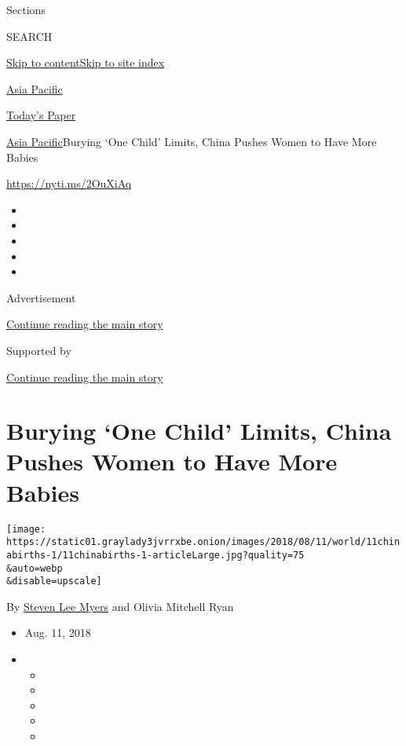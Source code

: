 Sections

SEARCH

\protect\hyperlink{site-content}{Skip to
content}\protect\hyperlink{site-index}{Skip to site index}

\href{https://www.nytimes3xbfgragh.onion/section/world/asia}{Asia
Pacific}

\href{https://myaccount.nytimes3xbfgragh.onion/auth/login?response_type=cookie\&client_id=vi}{}

\href{https://www.nytimes3xbfgragh.onion/section/todayspaper}{Today's
Paper}

\href{/section/world/asia}{Asia Pacific}\textbar{}Burying `One Child'
Limits, China Pushes Women to Have More Babies

\url{https://nyti.ms/2OuXiAq}

\begin{itemize}
\item
\item
\item
\item
\item
\end{itemize}

Advertisement

\protect\hyperlink{after-top}{Continue reading the main story}

Supported by

\protect\hyperlink{after-sponsor}{Continue reading the main story}

\hypertarget{burying-one-child-limits-china-pushes-women-to-have-more-babies}{%
\section{Burying `One Child' Limits, China Pushes Women to Have More
Babies}\label{burying-one-child-limits-china-pushes-women-to-have-more-babies}}

\texttt{[image: https://static01.graylady3jvrrxbe.onion/images/2018/08/11/world/11chinabirths-1/11chinabirths-1-articleLarge.jpg?quality=75\\\&auto=webp\\\&disable=upscale]}

By \href{https://www.nytimes3xbfgragh.onion/by/steven-lee-myers}{Steven
Lee Myers} and Olivia Mitchell Ryan

\begin{itemize}
\item
  Aug. 11, 2018
\item
  \begin{itemize}
  \item
  \item
  \item
  \item
  \item
  \end{itemize}
\end{itemize}

